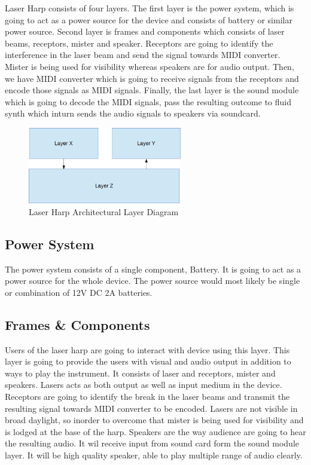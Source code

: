Laser Harp consists of four layers. The first layer is the power system, which is going to act as a power source for the device and consists of battery or similar power source. Second layer is frames and components which consists of laser beams, receptors, mister and speaker. Receptors are going to identify the interference in the laser beam and send the signal towards MIDI converter. Mister is being used for visibility whereas speakers are for audio output. Then, we have MIDI converter which is going to receive signals from the receptors and encode those signals as MIDI signals. Finally, the last layer is the sound module which is going to decode the MIDI signals, pass the resulting outcome to fluid synth which inturn sends the audio signals to speakers via soundcard. 

\begin{figure}[h!]
	\centering
 	\includegraphics[width=0.60\textwidth]{images/layers}
 \caption{Laser Harp Architectural Layer Diagram}
\end{figure}

\subsection{Power System}
The power system consists of a single component, Battery. It is going to act as a power source for the whole device. The power source would most likely be single or combination of 12V DC 2A batteries.

\subsection{Frames & Components}
Users of the laser harp are going to interact with device using this layer. This layer is going to provide the users with visual and audio output in addition to ways to play the instrument. It consists of laser and receptors, mister and speakers. Lasers acts as both output as well as input medium in the device. Receptors are going to identify the break in the laser beams and transmit the resulting signal towards MIDI converter to be encoded. Lasers are not visible in broad daylight, so  inorder to overcome that mister is being used for visibility and is lodged at the base of the harp. Speakers are the way audience are going to hear the resulting audio. It wil receive input from sound card form the sound module layer. It will be high quality speaker, able to play multiple range of audio clearly.


